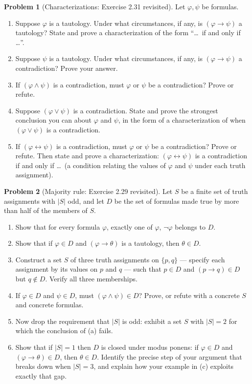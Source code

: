 \documentclass[11pt]{article}
\theoremstyle{definition}
\newtheorem{problem}{Problem}
\begin{document}
\begin{problem}[Characterizations: Exercise 2.31 revisited]
Let $\varphi,\psi$ be formulas.
\begin{enumerate}
\item[(a)] Suppose $\varphi$ is a tautology. Under what circumstances, if any, is
$(\varphi\to\psi)$ a tautology? State and prove a characterization of the form
``\dots\ if and only if \dots''.
\item[(b)] Suppose $\psi$ is a tautology. Under what circumstances, if any, is
$(\varphi\to\psi)$ a contradiction? Prove your answer.
\item[(c)] If $(\varphi\land\psi)$ is a contradiction, must $\varphi$ or $\psi$ be
a contradiction? Prove or refute.
\item[(d)] Suppose $(\varphi\lor\psi)$ is a contradiction. State and prove the
strongest conclusion you can about $\varphi$ and $\psi$, in the form of a
characterization of when $(\varphi\lor\psi)$ is a contradiction.
\item[(e)] If $(\varphi\leftrightarrow\psi)$ is a contradiction, must $\varphi$ or
$\psi$ be a contradiction? Prove or refute. Then state and prove a
characterization: $(\varphi\leftrightarrow\psi)$ is a contradiction if and only if
\dots\ (a condition relating the values of $\varphi$ and $\psi$ under each truth
assignment).
\end{enumerate}
\end{problem}

\begin{problem}[Majority rule: Exercise 2.29 revisited]
Let $S$ be a finite set of truth assignments with $|S|$ odd, and let $D$ be the
set of formulas made true by more than half of the members of $S$.
\begin{enumerate}
\item[(a)] Show that for every formula $\varphi$, exactly one of $\varphi$,
$\lnot\varphi$ belongs to $D$.
\item[(b)] Show that if $\varphi\in D$ and $(\varphi\to\theta)$ is a tautology,
then $\theta\in D$.
\item[(c)] Construct a set $S$ of three truth assignments on $\{p,q\}$ ---
specify each assignment by its values on $p$ and $q$ --- such that $p\in D$ and
$(p\to q)\in D$ but $q\notin D$. Verify all three memberships.
\item[(d)] If $\varphi\in D$ and $\psi\in D$, must $(\varphi\land\psi)\in D$?
Prove, or refute with a concrete $S$ and concrete formulas.
\item[(e)] Now drop the requirement that $|S|$ is odd: exhibit a set $S$ with
$|S|=2$ for which the conclusion of (a) fails.
\item[(f)] Show that if $|S|=1$ then $D$ is closed under modus ponens: if
$\varphi\in D$ and $(\varphi\to\theta)\in D$, then $\theta\in D$. Identify the
precise step of your argument that breaks down when $|S|=3$, and explain how your
example in (c) exploits exactly that gap.
\end{enumerate}
\end{problem}
\end{document}
